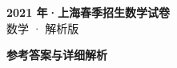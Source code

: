 \documentclass[zihao=-4, a4paper]{ctexart}
\begin{document}
\begin{center}
  {\Large\bfseries 2021 年·上海春季招生数学试卷}\\[4pt]
  {\large 数学 · 解析版}
\end{center}
\medskip
{}

\clearpage
{}
\begin{center}{\Large\bfseries 参考答案与详细解析}\end{center}
\medskip

\end{document}
